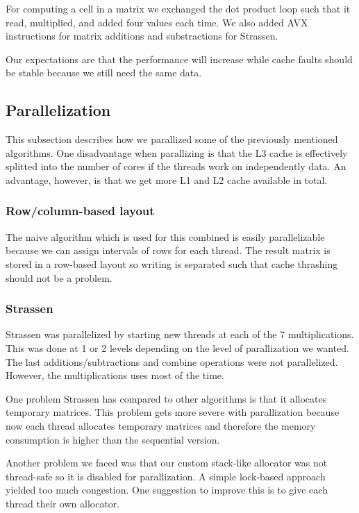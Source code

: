 For computing a cell in a matrix we exchanged the dot product loop such that it read, multiplied, and added four values each time. We also added AVX instructions for matrix additions and substractions for Strassen.

Our expectations are that the performance will increase while cache faults should be stable because we still need the same data. 

\subsection{Parallelization}

This subsection describes how we parallized some of the previously mentioned algorithms. One disadvantage when parallizing is that the L3 cache is effectively splitted into the number of cores if the threads work on independently data. An advantage, however, is that we get more L1 and L2 cache available in total.


\subsubsection{Row/column-based layout}

The naive algorithm which is used for this combined is easily parallelizable because we can assign intervals of rows for each thread. The result matrix is stored in a row-based layout so writing is separated such that cache thrashing should not be a problem.

\subsubsection{Strassen}

Strassen was parallelized by starting new threads at each of the 7 multiplications. This was done at 1 or 2 levels depending on the level of parallization we wanted. The last additions/subtractions and combine operations were not parallelized. However, the multiplications uses most of the time.

One problem Strassen has compared to other algorithms is that it allocates temporary matrices. This problem gets more severe with parallization because now each thread allocates temporary matrices and therefore the memory consumption is higher than the sequential version.

Another problem we faced was that our custom stack-like allocator was not thread-safe so it is disabled for parallization. A simple lock-based approach yielded too much congestion. One suggestion to improve this is to give each thread their own allocator.

